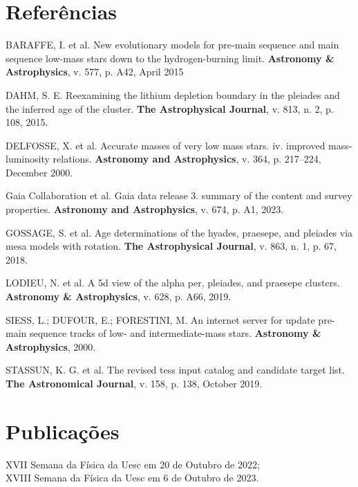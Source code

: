 \section{\textbf{Referências}}
\begin{SingleSpace}
	\noindent BARAFFE, I. et al. New evolutionary models for pre-main sequence and main sequence low-mass stars down to the hydrogen-burning limit.\textbf{ Astronomy \& Astrophysics}, v. 577, p. A42, April 2015
	\vspace*{12 pt}
	
	\noindent DAHM, S. E. Reexamining the lithium depletion boundary in the pleiades and the inferred
	age of the cluster. \textbf{The Astrophysical Journal}, v. 813, n. 2, p. 108, 2015.	\vspace*{12 pt}
	
	
	\noindent DELFOSSE, X. et al. Accurate masses of very low mass stars. iv. improved mass- luminosity relations.\textbf{ Astronomy and Astrophysics}, v. 364, p. 217–224, December 2000.
		\vspace*{12 pt}
	
	
	\noindent Gaia Collaboration et al. Gaia data release 3. summary of the content and survey
	properties. \textbf{Astronomy and Astrophysics}, v. 674, p. A1, 2023.	\vspace*{12 pt}
	
	
	\noindent	 GOSSAGE, S. et al. Age determinations of the hyades, praesepe, and pleiades via mesa models with rotation. \textbf{The Astrophysical Journal}, v. 863, n. 1, p. 67, 2018.	\vspace*{12 pt}
	
	
	\noindent  LODIEU, N. et al. A 5d view of the alpha per, pleiades, and praesepe clusters. \textbf{Astronomy \& Astrophysics}, v. 628, p. A66, 2019.
	\vspace*{12 pt}
	
	\noindent SIESS, L.; DUFOUR, E.; FORESTINI, M. An internet server for update pre-main sequence tracks of low- and intermediate-mass stars. \textbf{Astronomy \& Astrophysics}, 2000.	\vspace*{1 pt}


	\noindent STASSUN, K. G. et al. The revised tess input catalog and candidate target list. \textbf{The Astronomical Journal}, v. 158, p. 138, October 2019.	\vspace*{12 pt}
	
	
\end{SingleSpace}

\section{\textbf{Publicações}}
\noindent XVII Semana da Física da Uesc em 20 de Outubro de 2022;\\
\noindent XVIII Semana da Física da Uesc em 6 de Outubro de 2023.

